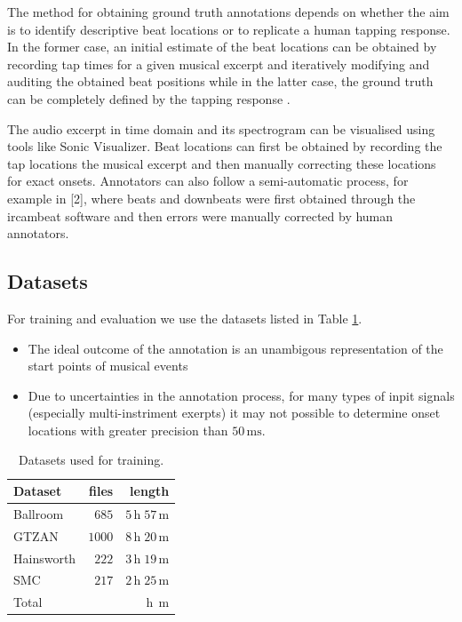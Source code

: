 \documentclass{article}
\begin{document}
The method for obtaining ground truth annotations depends on whether the aim is to identify descriptive beat locations or to replicate a human tapping response. In the former case, an initial estimate of the beat locations can be obtained by recording tap times for a given musical excerpt and iteratively modifying and auditing the obtained beat positions while in the latter case, the ground truth can be completely defined by the tapping response \cite{Davies2009b}.

The audio excerpt in time domain and its spectrogram can be visualised using tools like Sonic Visualizer. Beat locations can first be obtained by recording the tap locations the musical excerpt and then manually correcting these locations for exact onsets.  Annotators can also follow a semi-automatic process, for example in [2], where beats and downbeats were first obtained through the ircambeat software and then errors were manually corrected by human annotators.


\subsection{Datasets}
For training and evaluation we use the datasets listed in Table \ref{tab:datasets}.

\begin{itemize}
\item The ideal outcome of the annotation is an unambigous representation of the start points of musical events
\item Due to uncertainties in the annotation process, for many types of inpit signals (especially multi-instriment exerpts) it may not possible to determine onset locations with greater precision than $50\,\text{ms}$. \cite{Leveau2004}
\end{itemize}

\begin{table}[htbp]
	\caption{Datasets used for training.}
	\label{tab:datasets}
	\centering

	\begin{tabular}{lrr}
	\hline

	\hline
	\textbf{Dataset} & \textbf{files} & \textbf{length} \\
	\hline
		Ballroom \cite{Gouyon2006b, Krebs2013} & $685$ & $5\,\text{h} \;57\,\text{m}$\\
		GTZAN \cite{Tzanetakis2002b, marchand2015swing} & $1000$ & $8\,\text{h}\;20\,\text{m}$\\
		Hainsworth \cite{Hainsworth2004} & $222$ & $3\,\text{h}\;19\,\text{m}$\\
		SMC \cite{Holzapfel2012} & $217$ & $2\,\text{h}\;25\,\text{m}$\\	
	\hline
		Total & $ $ & $ \,\text{h}\; \,\text{m}$\\	
	\hline

	\hline
	\end{tabular}
\end{table}
\end{document}
